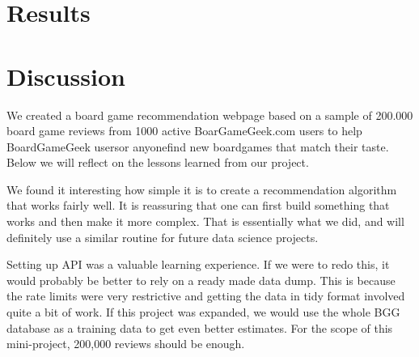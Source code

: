 \documentclass[a4paper,12pt,bibliography=totoc,numbers=noenddot,sfdefaults=false,abstract=true,notitlepage]{scrartcl} %
\begin{document}
	
	
	\section{Results}\label{results}
	
	
	
	
	
	
	
	
	\section{Discussion}\label{discussion}

	We created a board game recommendation webpage based on a sample of 200.000 board game reviews from 1000 active BoarGameGeek.com users to help BoardGameGeek users\textemdash or anyone\textemdash find new boardgames that match their taste. Below we will reflect on the lessons learned from our project.
	
	We found it interesting how simple it is to create a recommendation algorithm that works fairly well. It is reassuring that one can first build something that works and then make it more complex. That is essentially what we did, and will definitely use a similar routine for future data science projects.
	
	
	Setting up API was a valuable learning experience. If we were to redo this, it would probably be better to rely on a ready made data dump. This is because the rate limits were very restrictive and getting the data in tidy format involved quite a bit of work. If this project was expanded, we would use the whole BGG database as a training data to get even better estimates. For the scope of this mini-project, 200,000 reviews should be enough.

	
	
\end{document}

